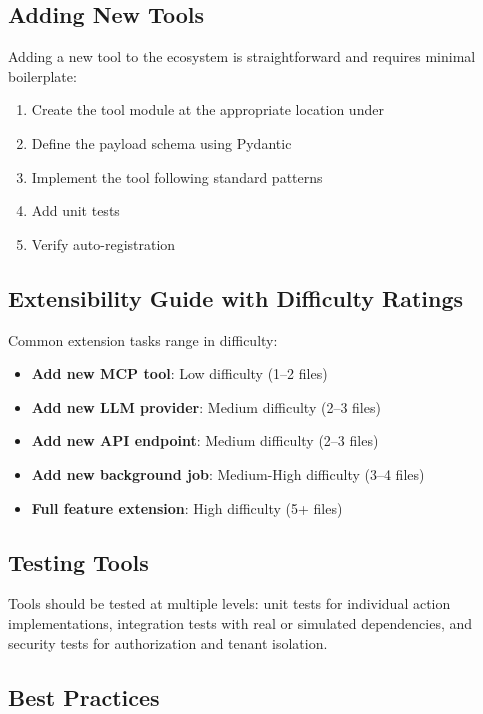 \documentclass[a4paper,twoside]{sapthesis}
\begin{document}
\subsection{Adding New Tools}
\label{subsec:adding-new-tools}

Adding a new tool to the ecosystem is straightforward and requires minimal boilerplate:

\begin{enumerate}
    \item Create the tool module at the appropriate location under 
    \item Define the payload schema using Pydantic
    \item Implement the tool following standard patterns
    \item Add unit tests
    \item Verify auto-registration
\end{enumerate}

\subsection{Extensibility Guide with Difficulty Ratings}
\label{subsec:extensibility-guide}

Common extension tasks range in difficulty:

\begin{itemize}
    \item \textbf{Add new MCP tool}: Low difficulty (1--2 files)
    \item \textbf{Add new LLM provider}: Medium difficulty (2--3 files)
    \item \textbf{Add new API endpoint}: Medium difficulty (2--3 files)
    \item \textbf{Add new background job}: Medium-High difficulty (3--4 files)
    \item \textbf{Full feature extension}: High difficulty (5+ files)
\end{itemize}

\subsection{Testing Tools}
\label{subsec:testing-tools}

Tools should be tested at multiple levels: unit tests for individual action implementations, integration tests with real or simulated dependencies, and security tests for authorization and tenant isolation.

\subsection{Best Practices}
\label{subsec:tool-best-practices}
\end{document}
